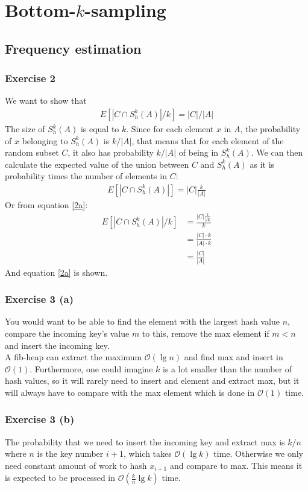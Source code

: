 \documentclass[a4paper]{article}
\begin{document}
\newpage
\section*{Bottom-$k$-sampling}
\subsection*{Frequency estimation}
\subsubsection*{Exercise 2}
We want to show that
\begin{align}\label{2a}
E[|C\cap S_h^k(A)|/k]=|C|/|A|
\end{align}
The size of $S_h^k(A)$ is equal to $k$. Since for each element $x$ in $A$, the probability of $x$ belonging to $S_h^k(A)$ is $k/|A|$, that means that for each element of the random subset $C$, it also has probability $k/|A|$ of being in $S_h^k(A)$. We can then calculate the expected value of the union between $C$ and $S_h^k(A)$ as it is probability times the number of elements in $C$:
\begin{align*}
E[|C\cap S_h^k(A)|]=|C|\frac{k}{|A|}
\end{align*}
Or from equation \ref{2a}:
\begin{align*}
E[|C\cap S_h^k(A)|/k]&=\frac{|C|\frac{k}{|A|}}{k} \\
&=\frac{|C|\cdot k}{|A|\cdot k} \\
&=\frac{|C|}{|A|}
\end{align*}
And equation \ref{2a} is shown.

\subsubsection*{Exercise 3 (a)}
You would want to be able to find the element with the largest hash value $n$, compare the incoming key's value $m$ to this, remove the max element if $m<n$ and insert the incoming key. \\
A fib-heap can extract the maximum $\mathcal{O}(\lg n)$ and find max and insert in $\mathcal{O}(1)$. Furthermore, one could imagine $k$ is a lot smaller than the number of hash values, so it will rarely need to insert and element and extract max, but it will always have to compare with the max element which is done in $\mathcal{O}(1)$ time.

\subsubsection*{Exercise 3 (b)}
The probability that we need to insert the incoming key and extract max is $k/n$ where $n$ is the key number $i+1$, which takes $\mathcal{O}(\lg k)$ time. Otherwise we only need constant amount of work to hash $x_{i+1}$ and compare to max. This means it is expected to be processed in $\mathcal{O}(\frac{k}{n}\lg k)$ time.
\end{document}
